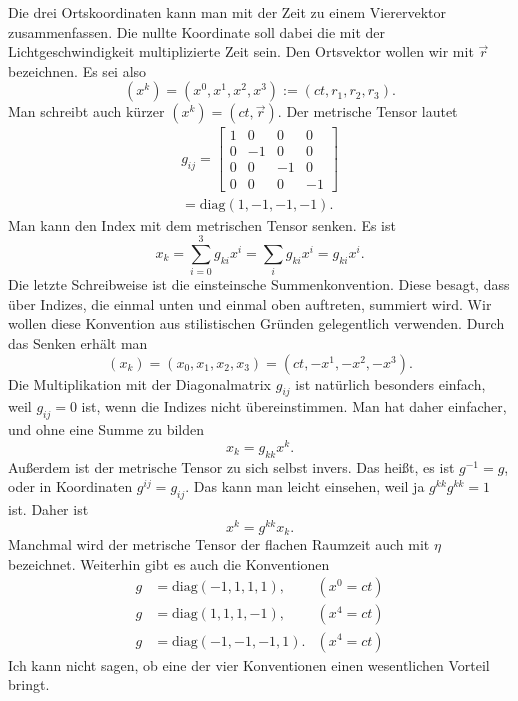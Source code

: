 \documentclass[a4paper,11pt,fleqn,twocolumn,twoside,dvipdfmx]{scrartcl}
\begin{document}
Die drei Ortskoordinaten kann man mit der Zeit zu einem Vierervektor
zusammenfassen. Die nullte Koordinate soll dabei die mit der
Lichtgeschwindigkeit multiplizierte Zeit sein. Den Ortsvektor wollen
wir mit $\vec r$ bezeichnen. Es sei also
\[(x^k) = (x^0,x^1,x^2,x^3) := (ct,r_1,r_2,r_3).\]
Man schreibt auch kürzer $(x^k)=(ct,\vec r)$.
Der metrische Tensor lautet%
\begin{gather*}
g_{ij} = \begin{bmatrix}
1 & 0 & 0 & 0\\
0 & -1 & 0 & 0\\
0 & 0 & -1 & 0\\
0 & 0 & 0 & -1
\end{bmatrix}\\
= \mathrm{diag}(1,-1,-1,-1).
\end{gather*}
Man kann den Index mit dem metrischen Tensor senken. Es ist%
\[x_k = \sum_{i=0}^3 g_{ki}x^i = \sum_{i} g_{ki}x^i = g_{ki}x^i.\]
Die letzte Schreibweise ist die einsteinsche Summenkonvention. Diese
besagt, dass über Indizes, die einmal unten und einmal oben auftreten,
summiert wird. Wir wollen diese Konvention aus stilistischen Gründen
gelegentlich verwenden. Durch das Senken erhält man
\[(x_k) = (x_0,x_1,x_2,x_3) = (ct,-x^1,-x^2,-x^3).\]
Die Multiplikation mit der Diagonalmatrix $g_{ij}$ ist natürlich
besonders einfach, weil $g_{ij}=0$ ist, wenn die Indizes nicht
übereinstimmen. Man hat daher einfacher, und ohne eine Summe zu bilden%
\[x_k = g_{kk}x^k.\]
Außerdem ist der metrische Tensor zu sich selbst invers. Das heißt,
es ist $g^{-1}=g$, oder in Koordinaten $g^{ij}=g_{ij}$. Das kann man
leicht einsehen, weil ja $g^{kk}g^{kk}=1$ ist. Daher ist%
\[x^k = g^{kk}x_k.\]
Manchmal wird der metrische Tensor der flachen Raumzeit auch mit
$\eta$ bezeichnet. Weiterhin gibt es auch die Konventionen%
\begin{align*}
g&=\mathrm{diag}(-1,1,1,1),& (x^0=ct)\\
g&=\mathrm{diag}(1,1,1,-1),& (x^4=ct)\\
g&=\mathrm{diag}(-1,-1,-1,1).& (x^4=ct)
\end{align*}
Ich kann nicht sagen, ob eine der vier Konventionen einen
wesentlichen Vorteil bringt.
\end{document}
